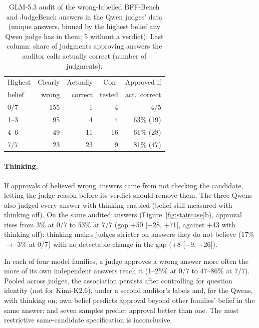 \documentclass[11pt]{article}
\newcounter{takeaway}
\begin{document}
\begin{table}[t]
\centering
\small
\setlength{\tabcolsep}{4pt}
\begin{tabular}{lrrrr}
\toprule
Highest & Clearly & Actually & Con- & Approved if \\
belief & wrong & correct & tested & act.\ correct \\
\midrule
0/7 & 155 & 1 & 4 & 4/5 \\
1--3 & 95 & 4 & 4 & 63\% (19) \\
4--6 & 49 & 11 & 16 & 61\% (28) \\
7/7 & 23 & 23 & 9 & 81\% (47) \\
\bottomrule
\end{tabular}
\caption{GLM-5.3 audit of the wrong-labelled BFF-Bench and JudgeBench answers in the Qwen judges' data (unique
answers, binned by the highest belief any Qwen judge has in them; 5 without a verdict). Last column: share of
judgments approving answers the auditor calls actually correct (number of judgments).}
\label{tab:audit}
\end{table}

\paragraph{Thinking.}
If approvals of believed wrong answers came from not checking the candidate, letting the judge reason before its
verdict should remove them. The three Qwens also judged every answer with thinking enabled (belief still measured
with thinking off). On the same audited answers (Figure~\ref{fig:staircase}b), approval rises from 3\% at 0/7 to
53\% at 7/7 (gap +50 [+28, +71], against +43 with thinking off): thinking makes judges stricter on answers they do
not believe (17\% $\rightarrow$ 3\% at 0/7) with no detectable change in the gap (+8 [$-$9, +26]).

\begin{takeaway}
In each of four model families, a judge approves a wrong answer more often the more of its own independent answers
reach it (1--25\% at 0/7 to 47--86\% at 7/7). Pooled across judges, the association persists after controlling for
question identity (not for Kimi-K2.6), under a second auditor's labels and, for the Qwens, with thinking on; own
belief predicts approval beyond other families' belief in the same answer; and seven samples predict approval better
than one. The most restrictive same-candidate specification is inconclusive.
\end{takeaway}
\end{document}
